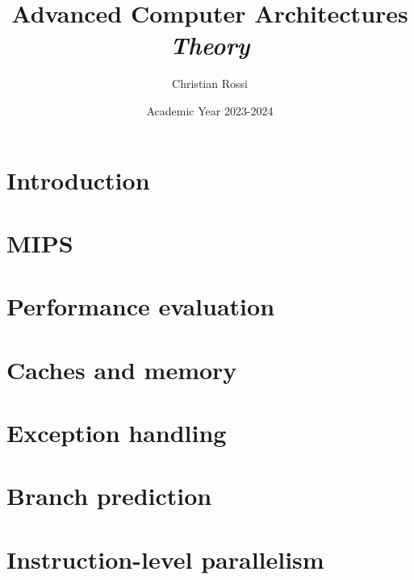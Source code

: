 \documentclass[12pt, a4paper]{report}
\title{Advanced Computer Architectures \\ \textit{Theory}}
\author{Christian Rossi}
\date{Academic Year 2023-2024}
\begin{document}
    \maketitle

    

    \cleardoublepage

    \tableofcontents

    \cleardoublepage

    \chapter{Introduction}
    

    \chapter{MIPS}
    
    
    

    \chapter{Performance evaluation}
    
    
    
    
    

    \chapter{Caches and memory}
    
    
    
    

    \chapter{Exception handling}
    
    
    
    

    \chapter{Branch prediction}
    
    
    

    \chapter{Instruction-level parallelism}
    
        
        
    
\end{document}
